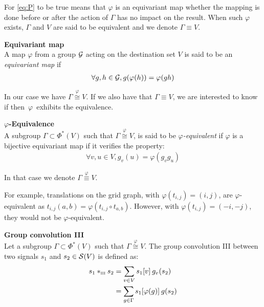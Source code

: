 For \eqref{eq:P} to be true means that $\varphi$ is an equivariant map \ie whether the mapping is done before or after the action of $\Gamma$ has no impact on the result. When such $\varphi$ exists, $\Gamma$ and $V$ are said to be equivalent and we denote $\Gamma \equiv V$.

\begin{definition}\textbf{Equivariant map}\\
A map $\varphi$ from a group $\cg$ acting on the destination set $V$ is said to be an \emph{equivariant map} if
\begin{gather*}
\forall g, h \in \cg, g(\varphi(h)) = \varphi(gh)
\end{gather*}
\end{definition}

In our case we have $\Gamma \overset{\varphi}{\cong} V$. If we also have that $\Gamma \equiv V$, we are interested to know if then~$\varphi$~exhibits the equivalence.

\begin{definition}\textbf{$\varphi$-Equivalence}\\
A subgroup $\Gamma \subset \Phi^*(V)$ such that $\Gamma \overset{\varphi}{\cong} V$, is said to be \emph{$\varphi$-equivalent} if $\varphi$ is a bijective equivariant map \ie if it verifies the property:
\begin{gather*}
\forall v, u \in V, g_v(u) = \varphi(g_vg_u) \tag{P}\label{eq:P}
\end{gather*}
\end{definition}

In that case we denote $\Gamma \overset{\varphi}{\equiv} V$.

\begin{remark}
For example, translations on the grid graph, with $\varphi(t_{i,j}) = (i,j)$, are $\varphi$-equivalent as $t_{i,j}(a,b) = \varphi(t_{i,j} \circ t_{a,b})$. However, with $\varphi(t_{i,j}) = (-i,-j)$, they would not be $\varphi$-equivalent.
\end{remark}

\begin{definition}\textbf{Group convolution III}\\
Let a subgroup $\Gamma \subset \Phi^*(V)$ such that $\Gamma \overset{\varphi}{\cong} V$.
The group convolution III between two signals $s_1$ and $s_2 \in \cs(V)$ is defined as:
\begin{align}
s_1 \ast_{\III} s_2 & = \displaystyle \sum_{v \in V} s_1[v] \h{2} g_v(s_2)\label{eq:vdom}\\
& = \displaystyle \sum_{g \in \Gamma} s_1[\varphi(g)] \h{2} g(s_2) \label{eq:premix}
\end{align}
\label{def:conv3}
\end{definition}

